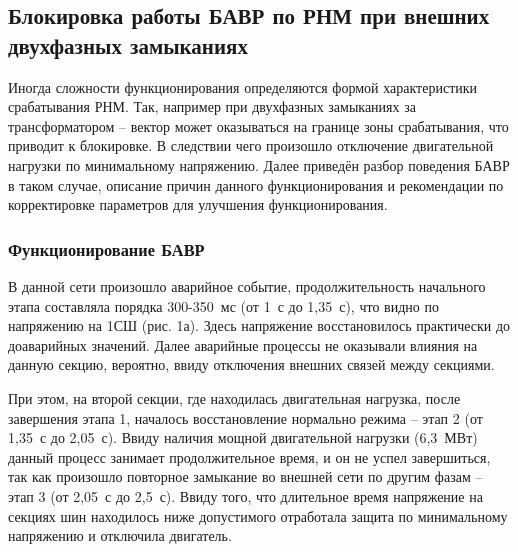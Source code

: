 
\subsection{Блокировка работы БАВР по РНМ при внешних двухфазных замыканиях}
\label{sec:ch1_external_two_phase_blocking}

Иногда сложности функционирования определяются формой характеристики срабатывания РНМ. Так, например при двухфазных замыканиях за трансформатором -- вектор может оказываться на границе зоны срабатывания, что приводит к блокировке. В следствии чего произошло отключение двигательной нагрузки по минимальному напряжению. Далее приведён разбор поведения БАВР в таком случае, описание причин данного функционирования и рекомендации по корректировке параметров для улучшения функционирования.

\subsubsection{Функционирование БАВР}

В данной сети произошло аварийное событие, продолжительность начального этапа составляла порядка 300-350~мс (от 1~с до 1,35~с), что видно по напряжению на 1СШ (рис. 1а). Здесь напряжение восстановилось практически до доаварийных значений. Далее аварийные процессы не оказывали влияния на данную секцию, вероятно, ввиду отключения внешних связей между секциями.

При этом, на второй секции, где находилась двигательная нагрузка, после завершения этапа 1, началось восстановление нормально режима -- этап 2 (от 1,35~с до 2,05~с). Ввиду наличия мощной двигательной нагрузки (6,3~МВт) данный процесс занимает продолжительное время, и он не успел завершиться, так как произошло повторное замыкание во внешней сети по другим фазам -- этап 3 (от 2,05~с до 2,5~с). Ввиду того, что длительное время напряжение на секциях шин находилось ниже допустимого отработала защита по минимальному напряжению и отключила двигатель.

